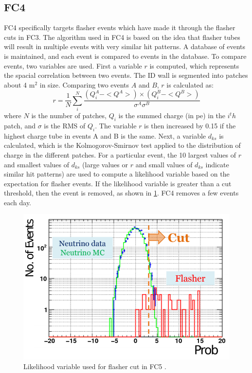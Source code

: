 \subsection{FC4}
FC4 specifically targets flasher events which have made it through the flasher cuts in FC3.  The algorithm used in FC4 is based on the idea that flasher tubes will result in multiple events with very similar hit patterns.  A database of events is maintained, and each event is compared to events in the database.  To compare events, two variables are used.  First a variable $r$ is computed, which represents the spacial correlation between two events.  The ID wall is segmented into patches about 4 m$^2$ in size.  Comparing two events $A$ and $B$, $    r$ is calculated as:
\begin{equation}
r=\frac{1}{N} \sum \limits_i^N \frac{(Q_i^A-<Q^A>)\times(Q_i^B-<Q^B>)}{\sigma^A \sigma^B}
\end{equation}
where $N$ is the number of patches, $Q_i$ is the summed charge (in pe) in the $i^th$ patch, and $\sigma$ is the RMS of $Q_i$.  The variable $r$ is then increased by 0.15 if the highest charge tube in events A and B is the same.  Next, a variable $d_{ks}$ is calculated, which is the Kolmogorov-Smirnov test applied to the distribution of charge in the different patches.  For a particular event, the 10 largest values of $r$ and smallest values of $d_{ks}$ (large values or $r$ and small values of $d_{ks}$ indicate similar hit patterns) are used to compute a likelihood variable based on the expectation for flasher events.  If the likelihood variable is greater than a cut threshold, then the event is removed, as shown in \cref{fig:flasher_cut}.  FC4 removes a few events each day.   
\begin{figure}
\centering
\includegraphics[width=0.5 \textwidth,keepaspectratio=true]{figures/Flasher_cut.png}
\caption{Likelihood variable used for flasher cut in FC5 \cite{Richard:2015kd}.}
\label{fig:flasher_cut}
\end{figure}
